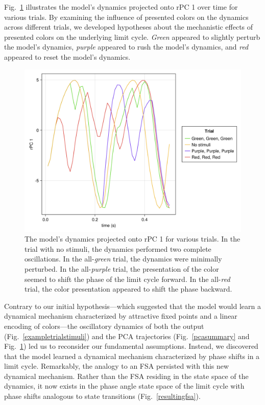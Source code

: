 \documentclass[conference]{IEEEtran}
\begin{document}
Fig.~\ref{pcaacceptedsets} illustrates the model's dynamics projected onto rPC 1 over time for various trials. By examining the influence of presented colors on the dynamics across different trials, we developed hypotheses about the mechanistic effects of presented colors on the underlying limit cycle. \textit{Green} appeared to slightly perturb the model's dynamics, \textit{purple} appeared to rush the model's dynamics, and \textit{red} appeared to reset the model's dynamics.

\begin{figure}[htbp]
\centerline{\includegraphics[scale=0.10]{rotated_pc1_accepted.png}}
\caption{The model’s dynamics projected onto rPC 1 for various trials. In the trial with no stimuli, the dynamics performed two complete oscillations. In the all-\textit{green} trial, the dynamics were minimally perturbed. In the all-\textit{purple} trial, the presentation of the color seemed to shift the phase of the limit cycle forward. In the all-\textit{red} trial, the color presentation appeared to shift the phase backward.}
\label{pcaacceptedsets}
\end{figure}

Contrary to our initial hypothesis—which suggested that the model would learn a dynamical mechanism characterized by attractive fixed points and a linear encoding of colors—the oscillatory dynamics of both the output (Fig.~\ref{exampletrialstimuli}) and the PCA trajectories (Fig.~\ref{pcasummary} and Fig.~\ref{pcaacceptedsets}) led us to reconsider our fundamental assumptions. Instead, we discovered that the model learned a dynamical mechanism characterized by phase shifts in a limit cycle. Remarkably, the analogy to an FSA persisted with this new dynamical mechanism. Rather than the FSA residing in the state space of the dynamics, it now exists in the phase angle state space of the limit cycle with phase shifts analogous to state transitions (Fig.~\ref{resultingfsa}).
\end{document}
